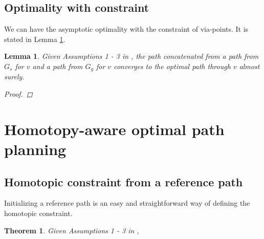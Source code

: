 \documentclass[letterpaper, 10 pt, conference]{ieeeconf}
\newtheorem{thm}{Theorem}
\newtheorem{lem}{Lemma}
\begin{document}
\subsection{Optimality with constraint}

We can have the asymptotic optimality with the constraint of via-points.
It is stated in Lemma \ref{lem:optimal_via_point}.

\begin{lem}
\label{lem:optimal_via_point}
Given Assumptions 1 - 3 in \cite{Karaman-RSS-10},
the path concatenated from a path from $ G_{s} $ for $ v $ and a path from $ G_{g} $ for $ v $ converges to the optimal path through $ v $ almost surely. 
\begin{proof}
\end{proof}
\end{lem}




\section{Homotopy-aware optimal path planning}
\label{sec:application}

\subsection{Homotopic constraint from a reference path}

Initializing a reference path is an easy and straightforward way of defining the homotopic constraint.

\begin{thm}
\label{thm:constrained_optimality}
Given Assumptions 1 - 3 in \cite{Karaman-RSS-10},
\end{thm}
\end{document}

